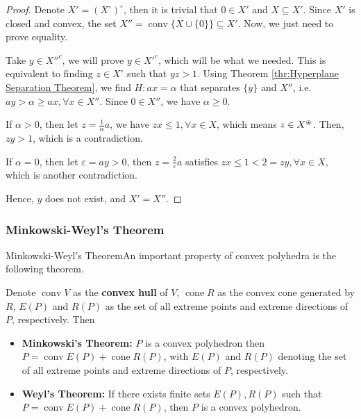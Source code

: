 \begin{proof}
  Denote \( X' = (X^{\circ})^{\circ} \), then it is trivial that \( 0 \in X' \)
  and \( X \subseteq X' \). Since \( X' \) is closed and convex, the set \( X''
  = \overline{\operatorname{conv} \{X \cup \{0\}  \}  } \subseteq X' \). Now, we
  just need to prove equality.

  Take \( y \in X''^{c} \), we will prove \( y \in X'^{c} \), which will be what
  we needed. This is equivalent to finding \( z \in X^{\circ} \) such that \( yz
  > 1\). Using Theorem \ref{thr:Hyperplane Separation Theorem}, we find \( H: ax
  = \alpha\) that separates \( \{y\}   \) and \( X'' \), i.e. \( ay > \alpha
  \ge ax, \forall x \in X'' \). Since \( 0 \in X'' \), we have \( \alpha \ge  0
  \).

  If \( \alpha > 0 \), then let \( z = \frac{1}{\alpha} a \), we have \( zx \le 1,
  \forall x \in X\), which means \( z \in X^{\ostar} \). Then, \( zy > 1 \),
  which is a contradiction.

  If \( \alpha = 0 \), then let \( \varepsilon = ay > 0 \), then \( z =
  \frac{2}{\varepsilon}a \) satisfies \( zx \le  1 < 2 = zy, \forall x \in X \),
  which is another contradiction.

  Hence, \( y \) does not exist, and \( X' = X'' \).
\end{proof}
\fi

\subsubsection{Minkowski-Weyl's Theorem} %
\label{sec:Minkowski-Weyl's Theorem}
Minkowski-Weyl's TheoremAn important property of convex polyhedra is the following theorem.

\begin{theorem}
\label{thr:Minkowski-Weyl's Theorem}
  Denote \( \operatorname{conv} V \) as the \textbf{convex hull} of \( V \), \(
  \operatorname{cone} R\) as the convex cone generated by \( R \), \( E(P) \)
  and \( R(P) \) as the set of all extreme points and extreme directions of \( P
  \), respectively. Then
  \begin{itemize}
  \item \textbf{Minkowski's Theorem:}
  \( P \) is a convex polyhedron then
  \( P = \operatorname{conv} E(P) + \operatorname{cone} R(P) \),
  with \( E(P) \) and \( R(P) \) denoting the set of all extreme points and
  extreme directions of \( P \), respectively.
\item \textbf{Weyl's Theorem:}
  If there exists finite sets \( E(P), R(P)  \) such that \( P = \operatorname{conv}
  E(P) + \operatorname{cone} R(P)\), then \( P \) is a convex polyhedron.
  \end{itemize}
\end{theorem}

